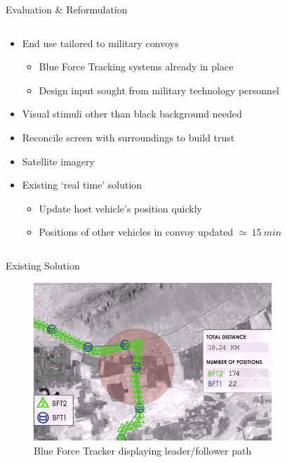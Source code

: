 \documentclass{beamer}
\begin{document}
\begin{frame}{Evaluation \& Reformulation}
\begin{columns}
\begin{column}{0.5\textwidth}
          \begin{itemize} \footnotesize
            \item End use tailored to military convoys
            \begin{itemize} \tiny
              \item Blue Force Tracking systems already in place
              \item Design input sought from military technology personnel
            \end{itemize} 
            \item Visual stimuli other than black background needed
            \item Reconcile screen with surroundings to build trust
            \item Satellite imagery
            \item Existing `real time' solution
            \begin{itemize} \tiny
              \item Update host vehicle's position quickly
              \item Positions of other vehicles in convoy updated $\simeq~15~min$
            \end{itemize}
          \end{itemize}
        \end{column}
      \end{columns}
    \end{frame}


    \begin{frame}{Existing Solution}
      \begin{figure}[ht] \centering
        \includegraphics[width=0.8\textwidth] {../graphics/bft_path.jpg}
        \caption{\footnotesize Blue Force Tracker displaying leader/follower path}
      \end{figure}
    \end{frame}
\end{document}
